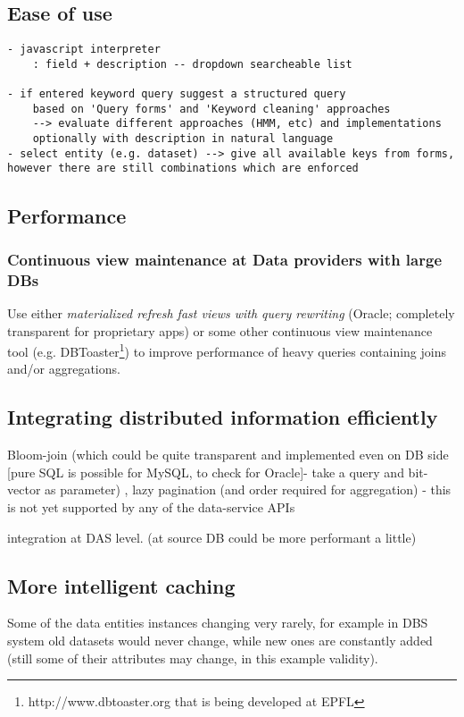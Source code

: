 \documentclass[a4paper,11pt,draft]{article}
\begin{document}
\subsection{Ease of use}
\begin{verbatim}
- javascript interpreter
    : field + description -- dropdown searcheable list
    
- if entered keyword query suggest a structured query
	based on 'Query forms' and 'Keyword cleaning' approaches
	--> evaluate different approaches (HMM, etc) and implementations
	optionally with description in natural language
- select entity (e.g. dataset) --> give all available keys from forms, however there are still combinations which are enforced
\end{verbatim}

\subsection{Performance}
\subsubsection{Continuous view maintenance at Data providers with large DBs}
Use either \textit{materialized refresh fast views with query rewriting} (Oracle; completely transparent for proprietary apps)\cite{Oracle11}
 or some other continuous view maintenance tool (e.g. DBToaster\footnote{http://www.dbtoaster.org that is being developed at EPFL}) to improve performance of heavy queries containing joins and/or aggregations.

\subsection{Integrating distributed information efficiently}
Bloom-join (which could be quite transparent and implemented even on DB side [pure SQL is possible for MySQL, to check for Oracle]- take a query and bit-vector as parameter) , lazy pagination (and order required for aggregation) - this is not yet supported by any of the data-service APIs

integration at DAS level. (at source DB could be more performant a little)

\subsection{More intelligent caching}
Some of the data entities instances changing very rarely, for example in DBS system old datasets would never change, while new ones are constantly added (still some of their attributes may change, in this example validity).
\end{document}
